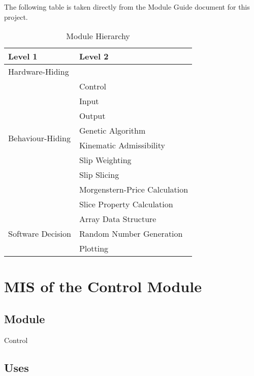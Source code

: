 \documentclass[12pt, titlepage]{article}
\begin{document}
The following table is taken directly from the Module Guide document for this 
project.

\begin{table}[h!]
	\centering
	\begin{tabular}{p{} p{} }
		\toprule
		\textbf{Level 1} & \textbf{Level 2} \\
		\midrule
		
		{Hardware-Hiding} & ~ \\
		\midrule
		
		\multirow{8}{0.3\textwidth}{Behaviour-Hiding} &
		Control \\
		& Input \\
		& Output \\
		& Genetic Algorithm \\
		& Kinematic Admissibility \\
		& Slip Weighting \\
		& Slip Slicing \\
		& Morgenstern-Price Calculation \\
		& Slice Property Calculation \\
		\midrule
		
		\multirow{3}{0.3\textwidth}{Software Decision} &
		Array Data Structure \\
		& Random Number Generation \\
		& Plotting \\
		\bottomrule
		
	\end{tabular}
	\caption{Module Hierarchy}
	\label{Table:Decomp}
\end{table}


\section{MIS of the Control Module}

\subsection{Module}
Control

\subsection{Uses}
\end{document}

